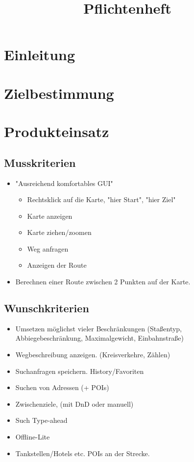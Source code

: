 \documentclass[a4paper, 11pt]{article}
\title{Pflichtenheft}
\begin{document}

\maketitle
\newpage
\tableofcontents
\newpage


\section{Einleitung}

\section{Zielbestimmung}

\section{Produkteinsatz}
\subsection{Musskriterien}
\begin{itemize}
\item "Ausreichend komfortables GUI"
\begin{itemize}
\item Rechtsklick auf die Karte, "hier Start", "hier Ziel"
\item Karte anzeigen
\item Karte ziehen/zoomen
\item Weg anfragen
\item Anzeigen der Route
\end{itemize}
\item Berechnen einer Route zwischen 2 Punkten auf der Karte.
\end{itemize}
\subsection{Wunschkriterien}
\begin{itemize}
\item Umsetzen möglichst vieler Beschränkungen (Staßentyp, Abbiegebeschränkung, 
Maximalgewicht, Einbahnstraße)

\item Wegbeschreibung anzeigen. (Kreisverkehre, Zählen)
\item Suchanfragen speichern. History/Favoriten

\item Suchen von Adressen (+ POIs)
\item Zwischenziele, (mit DnD oder manuell)
\item Such Type-ahead
\item Offline-Lite

\item Tankstellen/Hotels etc. POIs an der Strecke.
\end{itemize}
\end{document}
